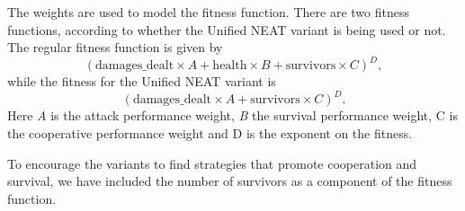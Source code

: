 The weights are used to model the fitness function. There are two
fitness functions, according to whether the Unified NEAT variant is
being used or not.  The regular fitness function is given by
\begin{equation*}
  (\text{damages\_dealt} \times A + \text{health} \times B + \text{survivors} \times C)^D,
\end{equation*}
while the fitness for the Unified NEAT variant is
\begin{equation*}
  (\text{damages\_dealt} \times A + \text{survivors} \times C)^D.
\end{equation*}
Here \emph{A} is the attack performance weight, \emph{B} the survival
performance weight, C is the cooperative performance weight and D is
the exponent on the fitness.

To encourage the variants to find strategies that promote cooperation
and survival, we have included the number of survivors as a component
of the fitness function.

